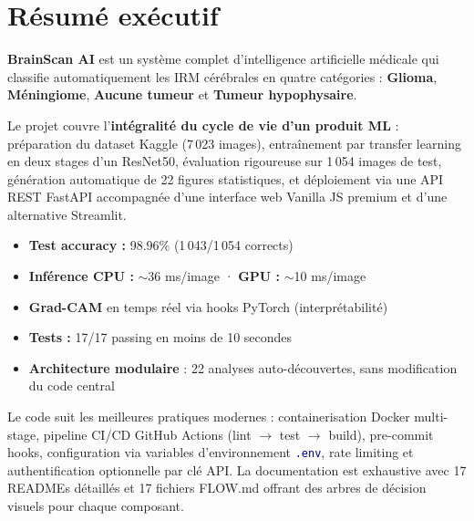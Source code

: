 \documentclass[11pt,a4paper,oneside]{report}
\newcommand{\code}[1]{\texttt{\textcolor{navy}{#1}}}
\newcommand{\rt}[1]{\textcolor{accentred}{#1}}
\newcommand{\og}[1]{\textcolor{accentorange}{#1}}
\newcommand{\gn}[1]{\textcolor{accentgreen}{#1}}
\newcommand{\bl}[1]{\textcolor{accentblue}{#1}}
\begin{document}
\chapter*{Résumé exécutif}

\textbf{BrainScan AI} est un système complet d'intelligence artificielle médicale qui classifie automatiquement les IRM cérébrales en quatre catégories : \rt{\textbf{Glioma}}, \og{\textbf{Méningiome}}, \gn{\textbf{Aucune tumeur}} et \bl{\textbf{Tumeur hypophysaire}}.

Le projet couvre l'\textbf{intégralité du cycle de vie d'un produit ML} : préparation du dataset Kaggle (7\,023 images), entraînement par transfer learning en deux stages d'un ResNet50, évaluation rigoureuse sur 1\,054 images de test, génération automatique de 22 figures statistiques, et déploiement via une API REST FastAPI accompagnée d'une interface web Vanilla JS premium et d'une alternative Streamlit.

\begin{successbox}
\begin{itemize}
\item \textbf{Test accuracy :} 98.96\% (1\,043/1\,054 corrects)
\item \textbf{Inférence CPU :} $\sim$36 ms/image · \textbf{GPU :} $\sim$10 ms/image
\item \textbf{Grad-CAM} en temps réel via hooks PyTorch (interprétabilité)
\item \textbf{Tests :} 17/17 passing en moins de 10 secondes
\item \textbf{Architecture modulaire} : 22 analyses auto-découvertes, sans modification du code central
\end{itemize}
\end{successbox}

Le code suit les meilleures pratiques modernes : containerisation Docker multi-stage, pipeline CI/CD GitHub Actions (lint $\to$ test $\to$ build), pre-commit hooks, configuration via variables d'environnement \code{.env}, rate limiting et authentification optionnelle par clé API. La documentation est exhaustive avec 17 READMEs détaillés et 17 fichiers FLOW.md offrant des arbres de décision visuels pour chaque composant.

\tableofcontents
\end{document}
